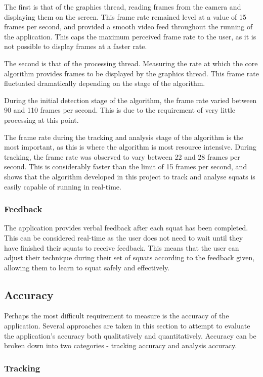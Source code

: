 The first is that of the graphics thread, reading frames from the camera and displaying them on the screen. This frame rate remained level at a value of 15 frames per second, and provided a smooth video feed throughout the running of the application. This caps the maximum perceived frame rate to the user, as it is not possible to display frames at a faster rate.

The second is that of the processing thread. Measuring the rate at which the core algorithm provides frames to be displayed by the graphics thread. This frame rate fluctuated dramatically depending on the stage of the algorithm.

During the initial detection stage of the algorithm, the frame rate varied between 90 and 110 frames per second. This is due to the requirement of very little processing at this point.

The frame rate during the tracking and analysis stage of the algorithm is the most important, as this is where the algorithm is most resource intensive. During tracking, the frame rate was observed to vary between 22 and 28 frames per second. This is considerably faster than the limit of 15 frames per second, and shows that the algorithm developed in this project to track and analyse squats is easily capable of running in real-time.

\subsubsection{Feedback}
The application provides verbal feedback after each squat has been completed. This can be considered real-time as the user does not need to wait until they have finished their squats to receive feedback. This means that the user can adjust their technique during their set of squats according to the feedback given, allowing them to learn to squat safely and effectively.

\subsection{Accuracy}
Perhaps the most difficult requirement to measure is the accuracy of the application. Several approaches are taken in this section to attempt to evaluate the application's accuracy both qualitatively and quantitatively. Accuracy can be broken down into two categories - tracking accuracy and analysis accuracy.

\subsubsection{Tracking}

